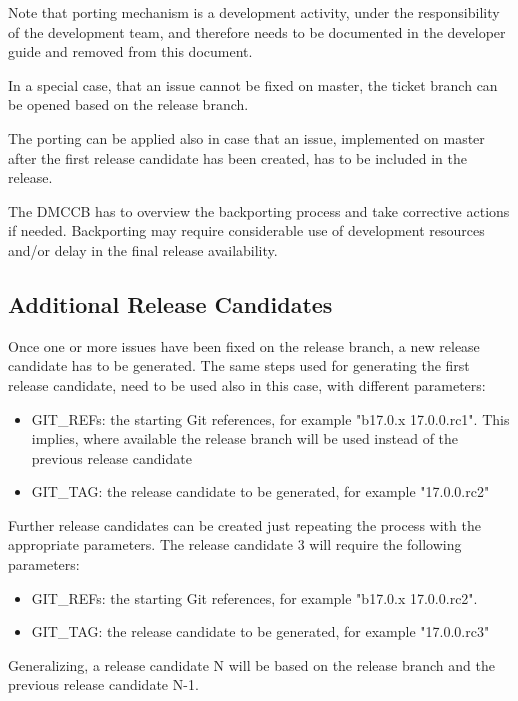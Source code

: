 Note that porting mechanism is a development activity, under the responsibility of the development team, and therefore needs to be documented in the developer guide and removed from this document.

In a special case, that an issue cannot be fixed on master, the ticket branch can be opened based on the release branch.

The porting can be applied also in case that an issue, implemented on master after the first release candidate has been created, has to be included in the release.

The DMCCB has to overview the backporting process and take corrective actions if needed. 
Backporting may require considerable use of development resources and/or delay in the final release availability.


\subsection{Additional Release Candidates} \label{sec:newrc}

Once one or more issues have been fixed on the release branch, a new release candidate has to be generated.
The same steps used for generating the first release candidate, need to be used also in this case, with different parameters:

\begin{itemize}
\item GIT\_REFs: the starting Git references, for example "b17.0.x 17.0.0.rc1". 
This implies, where available the release branch will be used instead of the previous release candidate
\item GIT\_TAG: the release candidate to be generated, for example "17.0.0.rc2"
\end{itemize}

Further release candidates can be created just repeating the process with the appropriate parameters.
The release candidate 3 will require the following parameters:

\begin{itemize}
\item GIT\_REFs: the starting Git references, for example "b17.0.x 17.0.0.rc2". 
\item GIT\_TAG: the release candidate to be generated, for example "17.0.0.rc3"
\end{itemize}

Generalizing, a release candidate N will be based on the release branch and the previous release candidate N-1.


